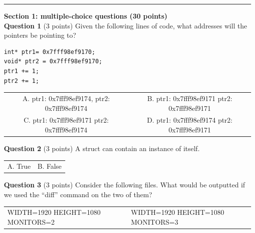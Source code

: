 \documentclass{exam}
\begin{document}
\newpage




\begin{center}\noindent\rule{6in}{0.4pt}\end{center}

{\Large\textbf{Section 1: multiple-choice questions (30 points)}}
\\

\textbf{Question 1} (3 points) Given the following lines of code, what addresses will the pointers be pointing to?

\begin{lstlisting}
int* ptr1= 0x7fff98ef9170;
void* ptr2 = 0x7fff98ef9170;
ptr1 += 1;
ptr2 += 1;
\end{lstlisting}

\begin{center}

\begin{tabular} { c  c } 
  A. ptr1: 0x7fff98ef9174, ptr2: 0x7fff98ef9174 & B. ptr1: 0x7fff98ef9171 ptr2: 0x7fff98ef9171 \\ 

  C. ptr1: 0x7fff98ef9171 ptr2: 0x7fff98ef9174 & D. ptr1: 0x7fff98ef9174 ptr2: 0x7fff98ef9171
\end{tabular}

\end{center}

\vspace{10px}

\textbf{Question 2} (3 points) A struct can contain an instance of itself.

\begin{center}

\begin{tabular} { c  c } 
  A. True & B. False \\ 
\end{tabular}

\end{center}

\textbf{Question 3} (3 points) Consider the following files. What would be outputted if we used the “diff” command on the two of them?

\begin{center}
\begin{tabular} { | m{1in} | m{1in} | } 
WIDTH=1920 \newline HEIGHT=1080 \newline MONITORS=2
& 
WIDTH=1920 \newline HEIGHT=1080 \newline MONITORS=3
\end{tabular}
\end{center}
\end{document}
